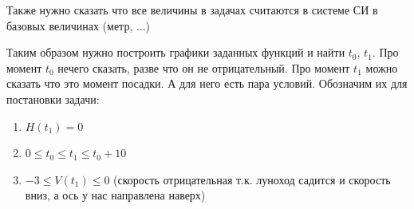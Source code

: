 \documentclass[12pt]{article}
\begin{document}
    Также нужно сказать что все величины в задачах считаются в системе СИ в базовых величинах
    (метр, ...)

    Таким образом нужно построить графики заданных функций и найти $t_0$, $t_1$. Про момент $t_0$
    нечего сказать, разве что он не отрицательный. Про момент $t_1$ можно сказать что это момент посадки.
    А для него есть пара условий. Обозначим их для постановки задачи:
    \begin{enumerate}
        \item $H(t_1) = 0$
        \item $0 \leq t_0 \leq t_1 \leq t_0 + 10$
        \item $-3 \leq V(t_1) \leq 0$ (скорость отрицательная т.к. луноход садится и скорость вниз,
        а ось у нас направлена наверх)
    \end{enumerate}
\end{document}

